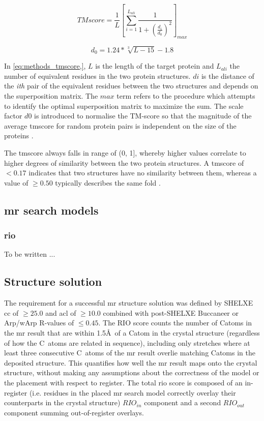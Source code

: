 \begin{equation} \label{eq:methods_tmscore}
TMscore=\frac{1}{L}\left [ \sum_{i=1}^{L_{ali}}\frac{1}{1+\left (\frac{d_i}{d_0}\right )^2}\right ]_{max}
\end{equation}

\begin{equation} \label{eq:methods_tmscore_constant}
d_0=1.24*\sqrt[3]{L-15}-1.8
\end{equation}

In \cref{eq:methods_tmscore,}, $L$ is the length of the target protein and $L_{ali}$ the number of equivalent residues in the two protein structures. $di$ is the distance of the \textit{ith} pair of the equivalent residues between the two structures and depends on the superposition matrix. The $max$ term refers to the procedure which attempts to identify the optimal superposition matrix to maximize the sum. The scale factor $d0$ is introduced to normalise the TM-score so that the magnitude of the average \gls{tmscore} for random protein pairs is independent on the size of the proteins \cite{Zhang2005-hx}.

The \gls{tmscore} always falls in range of (0, 1], whereby higher values correlate to higher degrees of similarity between the two protein structures. A \gls{tmscore} of $<0.17$ indicates that two structures have no similarity between them, whereas a value of $\geq0.50$ typically describes the same fold \cite{Xu2010-sw}.

\subsection{\acrlong{mr} search models}
\subsubsection{\acrlong{rio}} \label{sec:methods_mr_rio}
To be written ...

\subsection{Structure solution} \label{sec:methods_mr_success}
The requirement for a successful \gls{mr} structure solution was defined by SHELXE \gls{cc} of $\geq25.0$ and \gls{acl} of $\geq10.0$ combined with post-SHELXE Buccaneer \cite{} or Arp/wArp \cite{} R-values of $\leq0.45$.
The RIO score counts the number of C\textalpha atoms in the \gls{mr} result that are within 1.5\AA\ of a C\textalpha atom in the crystal structure (regardless of how the C\textalpha\ atoms are related in sequence), including only stretches where at least three consecutive C\textalpha\ atoms of the \gls{mr} result overlie matching C\textalpha atoms in the deposited structure. This quantifies how well the \gls{mr} result maps onto the crystal structure, without making any assumptions about the correctness of the model or the placement with respect to register. The total \gls{rio} score is composed of an in-register (i.e. residues in the placed \gls{mr} search model correctly overlay their counterparts in the crystal structure) $RIO_{in}$ component and a second $RIO_{out}$ component summing out-of-register overlays.
